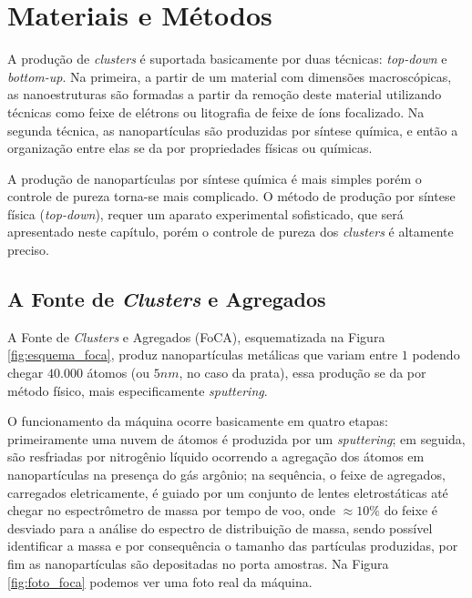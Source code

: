 \chapter{Materiais e Métodos}
\label{c3}


A produção de \textit{clusters} é suportada basicamente por duas técnicas: \textit{top-down} e \textit{bottom-up}. Na primeira, a partir de um material com dimensões macroscópicas, as nanoestruturas são formadas a partir da remoção deste material utilizando técnicas como feixe de elétrons ou litografia de feixe de íons focalizado. Na segunda técnica, as nanopartículas são produzidas por síntese química, e então a organização entre elas se da por propriedades físicas ou químicas.

A produção de nanopartículas por síntese química é mais simples porém o controle de pureza torna-se mais complicado. O método de produção por síntese física (\textit{top-down}), requer um aparato experimental sofisticado, que será apresentado neste capítulo, porém o controle de pureza dos \textit{clusters} é altamente preciso.





\section{A Fonte de \textit{Clusters} e Agregados}

A Fonte de \textit{Clusters} e Agregados (FoCA), esquematizada na Figura \ref{fig:esquema_foca}, produz nanopartículas metálicas que variam entre $1$ podendo chegar $40.000$ átomos (ou $5nm$, no caso da prata), essa produção se da por método físico, mais especificamente \textit{sputtering}.

O funcionamento da máquina ocorre basicamente em quatro etapas: primeiramente uma nuvem de átomos é produzida por um \textit{sputtering}; em seguida, são resfriadas por nitrogênio líquido ocorrendo a agregação dos átomos em nanopartículas na presença do gás argônio; na sequência, o feixe de agregados, carregados eletricamente, é guiado por um conjunto de lentes eletrostáticas até chegar no espectrômetro de massa por tempo de voo, onde $\approx10\%$ do feixe é desviado para a análise do espectro de distribuição de massa, sendo possível identificar a massa e por consequência o tamanho das partículas produzidas, por fim as nanopartículas são depositadas no porta amostras. Na Figura \ref{fig:foto_foca} podemos ver uma foto real da máquina. 

